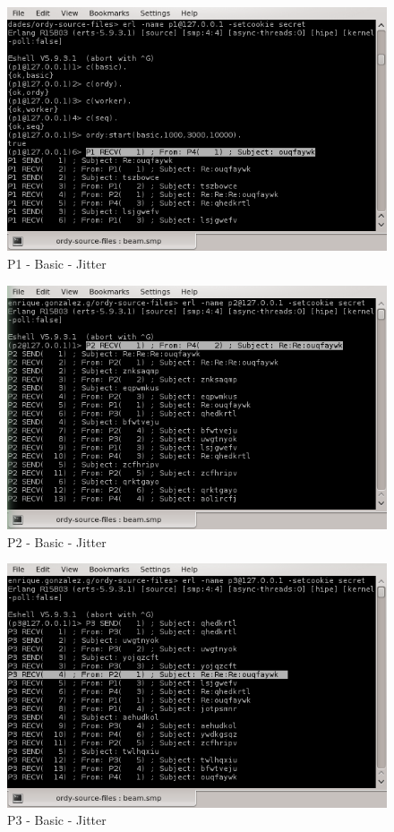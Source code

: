 \begin{figure}[h!]
\centering
\includegraphics[scale=0.8]{sections/screenshots/p1_basic.png}
\caption{P1 - Basic - Jitter}
\label{fig:p1_basic_jitter}
\end{figure}

\begin{figure}[h!]
\centering
\includegraphics[scale=0.8]{sections/screenshots/p2_basic.png}
\caption{P2 - Basic - Jitter}
\label{fig:p2_basic_jitter}
\end{figure}

\begin{figure}[h!]
\centering
\includegraphics[scale=0.8]{sections/screenshots/p3_basic.png}
\caption{P3 - Basic - Jitter}
\label{fig:p3_basic_jitter}
\end{figure}

